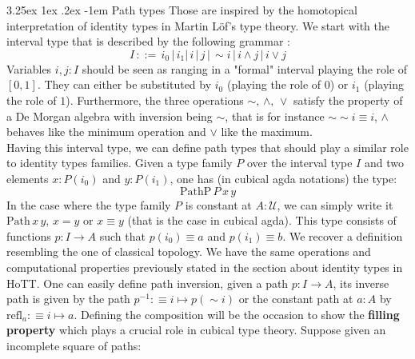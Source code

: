\documentclass{report}
\makeatletter
\renewcommand\paragraph{\@startsection{paragraph}{5}{\z@}%
  {3.25ex \@plus1ex \@minus.2ex}%
  {-1em}%
  {\normalfont\normalsize\bfseries}}
\makeatother
\begin{document}
\paragraph{Path types} Those are inspired by the homotopical interpretation of identity types in Martin Löf's type theory. We start with the interval type that is described by the following grammar : 
$$I \hspace{2pt} ::= \hspace{2pt} i_0 \hspace{2pt} \vert \hspace{2pt}i_1 \vert \hspace{2pt}  i \hspace{2pt} \vert \hspace{2pt}  j \hspace{2pt} \vert \hspace{2pt} \sim i \hspace{2pt} \vert \hspace{2pt} i \land j \hspace{2pt}\vert \hspace{2pt} i \lor j$$
Variables $i,j : I$ should be seen as ranging in a "formal" interval playing the role of $[0,1]$. They can either be substituted by $i_0$ (playing the role of $0$) or $i_1$ (playing the role of $1$). Furthermore, the three operations $\sim, \hspace{2pt} \land, \hspace{2pt} \lor$ satisfy the property of a De Morgan algebra with inversion being $\sim$, that is for instance $\sim \sim i \equiv i$, $\land$ behaves like the minimum operation and $\lor$ like the maximum.\\
Having this interval type, we can define path types that should play a similar role to identity types families. Given a type family $P$ over the interval type $I$ and two elements $x : P(i_0)$ and $y : P(i_1)$, one has (in cubical agda notations) the type: 
$$\mathrm{PathP} \hspace{2pt} P \hspace{2pt} x \hspace{2pt} y$$
In the case where the type family $P$ is constant at $A : \mathcal{U}$, we can simply write it $\mathrm{Path} \hspace{2pt} x \hspace{2pt} y$, $x=y$ or $x \equiv y$ (that is the case in cubical agda). This type consists of functions $p : I \rightarrow A$ such that $p(i_0)\equiv a$ and $p(i_1) \equiv b$. We recover a definition resembling the one of classical topology. We have the same operations and computational properties previously stated in the section about identity types in HoTT. One can easily define path inversion, given a path $p : I \rightarrow A$, its inverse path is given by the path $p^{-1} :\equiv i \mapsto p( \sim i)$ or the constant path at $a : A$ by $ \mathrm{refl}_a :\equiv i \mapsto a$. Defining the composition will be the occasion to show the \textbf{filling property} which plays a crucial role in cubical type theory. Suppose given an incomplete square of paths:
\end{document}
